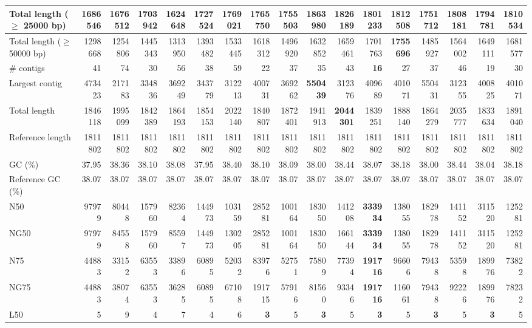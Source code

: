 \documentclass[12pt,a4paper]{article}
\begin{document}
\begin{table}[ht]
\begin{center}
\begin{tabular}{|l*{16}{|r}|}
Total length ($\geq$ 25000 bp) & 1686546 & 1676512 & 1703942 & 1624648 & 1727524 & 1769021 & 1765750 & 1755503 & {\bf 1863980} & 1826189 & 1801233 & 1812508 & 1751712 & 1808181 & 1794781 & 1810534 \\ \hline
Total length ($\geq$ 50000 bp) & 1298668 & 1254806 & 1445343 & 1313950 & 1393482 & 1533445 & 1618312 & 1496920 & 1632852 & 1659461 & 1701763 & {\bf 1755696} & 1485927 & 1564002 & 1649111 & 1681577 \\ \hline
\# contigs & 41 & 74 & 30 & 56 & 38 & 59 & 22 & 37 & 35 & 43 & {\bf 16} & 27 & 37 & 46 & 19 & 30 \\ \hline
Largest contig & 473423 & 217183 & 334836 & 369249 & 343779 & 312213 & 400731 & 369262 & {\bf 550439} & 312376 & 409689 & 401071 & 550431 & 312355 & 400825 & 401071 \\ \hline
Total length & 1846118 & 1995099 & 1842389 & 1864193 & 1854153 & 2022140 & 1840807 & 1872401 & 1941913 & {\bf 2044301} & 1839251 & 1888140 & 1864279 & 2035777 & 1833634 & 1891040 \\ \hline
Reference length & 1811802 & 1811802 & 1811802 & 1811802 & 1811802 & 1811802 & 1811802 & 1811802 & 1811802 & 1811802 & 1811802 & 1811802 & 1811802 & 1811802 & 1811802 & 1811802 \\ \hline
GC (\%) & 37.95 & 38.36 & 38.10 & 38.08 & 37.95 & 38.40 & 38.10 & 38.09 & 38.00 & 38.44 & 38.07 & 38.18 & 38.00 & 38.44 & 38.04 & 38.18 \\ \hline
Reference GC (\%) & 38.07 & 38.07 & 38.07 & 38.07 & 38.07 & 38.07 & 38.07 & 38.07 & 38.07 & 38.07 & 38.07 & 38.07 & 38.07 & 38.07 & 38.07 & 38.07 \\ \hline
N50 & 97979 & 80448 & 157960 & 82364 & 144973 & 103159 & 285281 & 100164 & 183050 & 141208 & {\bf 333934} & 138055 & 182978 & 141152 & 311520 & 125281 \\ \hline
NG50 & 97979 & 84558 & 157960 & 85597 & 144973 & 130205 & 285281 & 100164 & 183050 & 166144 & {\bf 333934} & 138055 & 182978 & 141152 & 311520 & 125281 \\ \hline
N75 & 44883 & 33152 & 63553 & 33896 & 60895 & 52032 & 83976 & 52751 & 75809 & 77394 & {\bf 191716} & 96606 & 79438 & 53598 & 189976 & 73822 \\ \hline
NG75 & 44883 & 38074 & 63553 & 36285 & 60895 & 67108 & 191715 & 57916 & 81560 & 93346 & {\bf 191716} & 116061 & 79438 & 92226 & 189976 & 78232 \\ \hline
L50 & 5 & 9 & 4 & 7 & 4 & 6 & {\bf 3} & 5 & {\bf 3} & 5 & {\bf 3} & 5 & {\bf 3} & 5 & {\bf 3} & 5 \\ \hline

\end{tabular}
\end{center}
\end{table}
\end{document}

